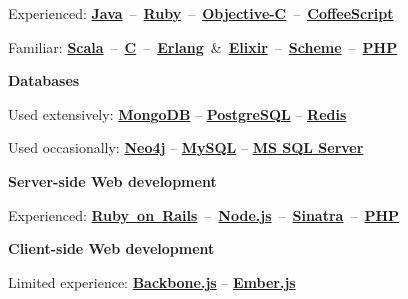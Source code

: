 \documentclass{tccv}
\begin{document}
{{\hspace{2pt}%
Experienced:
\mbox{\href{http://www.oracle.com/technetwork/java/}{\bf Java} -- %
     \href{https://www.ruby-lang.org/en/}{\bf Ruby} -- %
     \href{https://en.wikipedia.org/wiki/Objective-C}{\bf Objective-C} -- %
     \href{http://coffeescript.org}{\bf CoffeeScript}%
}

\hspace{2pt}%
Familiar:
\mbox{\href{http://www.scala-lang.org}{\bf Scala} -- %
     \href{https://en.wikipedia.org/wiki/C_(programming_language)}{\bf C} -- %
     \href{http://www.erlang.org}{\bf Erlang} \& %
     \href{http://elixir-lang.org}{\bf Elixir} --  %
     \href{http://schemers.org}{\bf Scheme} -- %
     \href{http://php.net}{\bf PHP}%
}



\vspace{9pt}%
\hspace{-1pt}%
\textsf{\textbf{Databases}}
	 
\hspace{2pt}%
Used extensively: %
     \href{http://www.mongodb.org}{\bf MongoDB} -- %
     \href{http://www.postgresql.org}{\bf PostgreSQL} -- %
     \href{http://redis.io}{\bf Redis}%

\hspace{2pt}%
Used occasionally: %
     \href{http://www.neo4j.org}{\bf Neo4j} -- %
     \href{http://www.mysql.com}{\bf MySQL} -- %
     \href{http://www.microsoft.com/en-us/sqlserver/default.aspx}{\bf MS SQL Server}%



\vspace{9pt}%
\hspace{-1pt}%
\textsf{\textbf{Server-side Web development}}
 
\hspace{2pt}%
Experienced: %
\mbox{\href{http://rubyonrails.org}{\bf Ruby on Rails} -- %
     \href{http://nodejs.org}{\bf Node.js} -- %
     \href{http://www.sinatrarb.com}{\bf Sinatra} -- %
     \href{http://php.net}{\bf PHP}%
}



\vspace{9pt}%
\hspace{-1pt}%
\textsf{\textbf{Client-side Web development}}
	 
\hspace{2pt}%
Limited experience: %
     \href{http://backbonejs.org}{\bf Backbone.js} -- %
     \href{http://emberjs.com}{\bf Ember.js}%



}}
\end{document}
